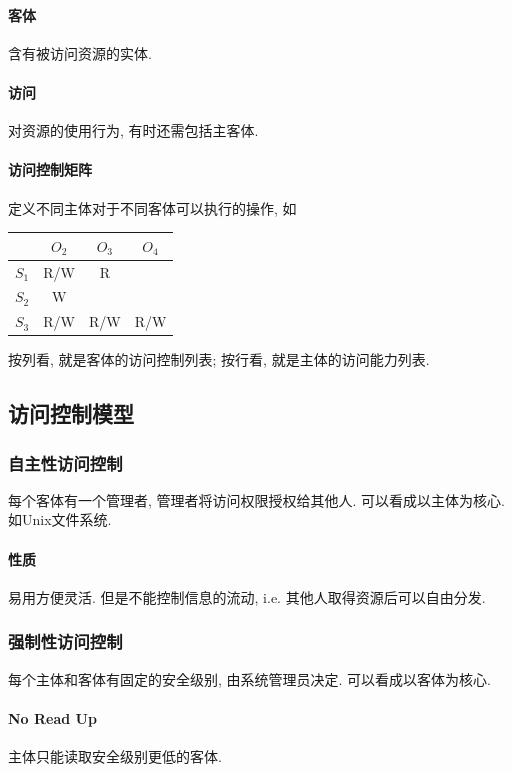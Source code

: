 \documentclass{ctexart}
\begin{document}
\paragraph{客体} 含有被访问资源的实体.
\paragraph{访问} 对资源的使用行为, 有时还需包括主客体.
\paragraph{访问控制矩阵} 定义不同主体对于不同客体可以执行的操作, 如
    \begin{center}
        \begin{tabularx}{0.6\textwidth}{|C|C|C|C|}
            \hline
             & $O_2$ & $O_3$ & $O_4$\\
            \hline
            $S_1$ & R/W & R & \\
            \hline
            $S_2$ & W & & \\
            \hline
            $S_3$ & R/W & R/W & R/W\\
            \hline
        \end{tabularx}
    \end{center}
    按列看, 就是客体的访问控制列表; 按行看, 就是主体的访问能力列表.

\subsection{访问控制模型}
\subsubsection{自主性访问控制}
    每个客体有一个管理者, 管理者将访问权限授权给其他人. 可以看成以主体为核心.
    如Unix文件系统.\par
\paragraph{性质}
    易用方便灵活. 但是不能控制信息的流动, i.e. 其他人取得资源后可以自由分发.
\subsubsection{强制性访问控制}
    每个主体和客体有固定的安全级别, 由系统管理员决定. 可以看成以客体为核心.
\paragraph{No Read Up}
    主体只能读取安全级别更低的客体.
\end{document}
